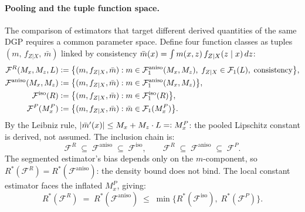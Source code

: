 \paragraph{Pooling and the tuple function space.}
The comparison of estimators that target different derived quantities of the same DGP requires a common parameter space.
Define four function classes as tuples $(m,\, f_{Z|X},\, \bar{m})$ linked by consistency $\bar{m}(x) = \int m(x,z)\, f_{Z|X}(z \mid x)\, dz$:
\begin{align*}
	\mathcal{F}^R(M_x, M_z, L) &\vcentcolon= \bigl\{ (m, f_{Z|X}, \bar{m}) : m \in \mathcal{F}_1^{\mathrm{aniso}}(M_x, M_z),\; f_{Z|X} \in \mathcal{F}_1(L),\; \text{consistency} \bigr\}, \\
	\mathcal{F}^{\mathrm{aniso}}(M_x, M_z) &\vcentcolon= \bigl\{ (m, f_{Z|X}, \bar{m}) : m \in \mathcal{F}_1^{\mathrm{aniso}}(M_x, M_z) \bigr\}, \\
	\mathcal{F}^{\mathrm{iso}}(R) &\vcentcolon= \bigl\{ (m, f_{Z|X}, \bar{m}) : m \in \mathcal{F}_1^{\mathrm{iso}}(R) \bigr\}, \\
	\mathcal{F}^P(M_x^P) &\vcentcolon= \bigl\{ (m, f_{Z|X}, \bar{m}) : \bar{m} \in \mathcal{F}_1(M_x^P) \bigr\}.
\end{align*}
By the Leibniz rule, $\lvert\bar{m}'(x)\rvert \leq M_x + M_z \cdot L =\vcentcolon M_x^P$: the pooled Lipschitz constant is derived, not assumed.
The inclusion chain is:
\begin{equation*}
	\mathcal{F}^R \;\subseteq\; \mathcal{F}^{\mathrm{aniso}} \;\subseteq\; \mathcal{F}^{\mathrm{iso}}, \qquad
	\mathcal{F}^R \;\subseteq\; \mathcal{F}^{\mathrm{aniso}} \;\subseteq\; \mathcal{F}^P.
\end{equation*}
The segmented estimator's bias depends only on the $m$-component, so $R^*(\mathcal{F}^R) = R^*(\mathcal{F}^{\mathrm{aniso}})$: the density bound does not bind.
The local constant estimator faces the inflated $M_x^P$, giving:
\begin{equation*}
	R^*(\mathcal{F}^R) \;=\; R^*(\mathcal{F}^{\mathrm{aniso}}) \;\leq\; \min\bigl\{ R^*(\mathcal{F}^{\mathrm{iso}}),\; R^*(\mathcal{F}^P) \bigr\}.
\end{equation*}


